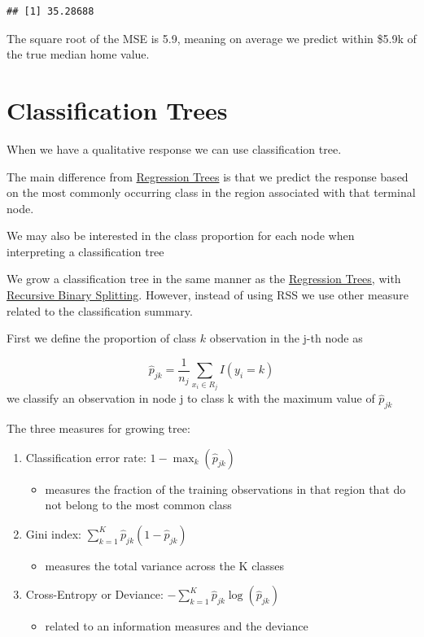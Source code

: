 \documentclass[
]{book}
\providecommand{\tightlist}{%
  \setlength{\itemsep}{0pt}\setlength{\parskip}{0pt}}
\begin{document}
\begin{verbatim}
## [1] 35.28688
\end{verbatim}

The square root of the MSE is 5.9, meaning on average we predict within \$5.9k of the true median home value.

\hypertarget{classification-trees}{%
\section{Classification Trees}\label{classification-trees}}

When we have a qualitative response we can use classification tree.

The main difference from \protect\hyperlink{regression-trees}{Regression Trees} is that we predict the response based on the most commonly occurring class in the region associated with that terminal node.

We may also be interested in the class proportion for each node when interpreting a classification tree

We grow a classification tree in the same manner as the \protect\hyperlink{regression-trees}{Regression Trees}, with \protect\hyperlink{recursive-binary-splitting}{Recursive Binary Splitting}. However, instead of using RSS we use other measure related to the classification summary.

First we define the proportion of class \(k\) observation in the j-th node as

\[
\hat{p}_{jk} = \frac{1}{n_j} \sum_{x_i \in R_j} I(y_i = k)
\]we classify an observation in node j to class k with the maximum value of \(\hat{p}_{jk}\)

The three measures for growing tree:

\begin{enumerate}
\def\labelenumi{\arabic{enumi}.}
\item
  Classification error rate: \(1 - \max_{{k}} (\hat{p}_{jk})\)

  \begin{itemize}
  \tightlist
  \item
    measures the fraction of the training observations in that region that do not belong to the most common class
  \end{itemize}
\item
  Gini index: \(\sum_{k=1}^K \hat{p}_{jk}(1 - \hat{p}_{jk})\)

  \begin{itemize}
  \tightlist
  \item
    measures the total variance across the K classes
  \end{itemize}
\item
  Cross-Entropy or Deviance: \(-\sum_{k=1}^K \hat{p}_{jk} \log (\hat{p}_{jk})\)

  \begin{itemize}
  \tightlist
  \item
    related to an information measures and the deviance
  \end{itemize}
\end{enumerate}
\end{document}
